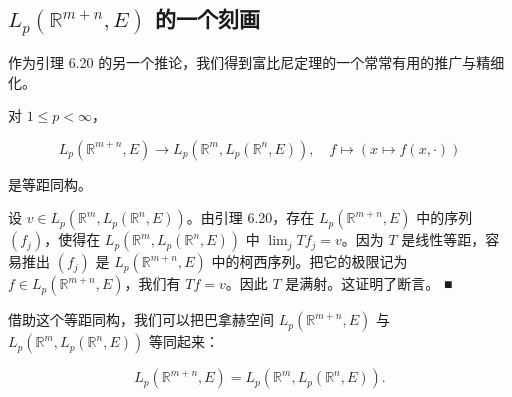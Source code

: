 \subsection*{$ L_p(\mathbb{R}^{m+n},E) $ 的一个刻画}

作为引理 6.20 的另一个推论，我们得到富比尼定理的一个常常有用的推广与精细化。

\begin{theorem}

对 $ 1 \le p < \infty $，

\[
L_{p}(\mathbb{R}^{m+n},E) \to L_{p}\left(\mathbb{R}^{m},L_{p}(\mathbb{R}^{n},E)\right) ,\quad f \mapsto (x \mapsto f(x,\cdot))
\]

是等距同构。

\proofhead
设 $ v \in L_{p}\left(\mathbb{R}^{m},L_{p}(\mathbb{R}^{n},E)\right) $。由引理 6.20，存在 $ L_{p}(\mathbb{R}^{m+n},E) $ 中的序列 $ (f_{j}) $，使得在 $ L_{p}\left(\mathbb{R}^{m},L_{p}(\mathbb{R}^{n},E)\right) $ 中 $ \lim_{j}Tf_{j} = v $。因为 $ T $ 是线性等距，容易推出 $ (f_{j}) $ 是 $ L_{p}(\mathbb{R}^{m+n},E) $ 中的柯西序列。把它的极限记为 $ f \in L_{p}(\mathbb{R}^{m+n},E) $，我们有 $ Tf = v $。因此 $ T $ 是满射。这证明了断言。 \nobreak\hspace{0.35em}■
\end{theorem}

借助这个等距同构，我们可以把巴拿赫空间 $ L_{p}(\mathbb{R}^{m+n},E) $ 与 $ L_{p}\left(\mathbb{R}^{m},L_{p}(\mathbb{R}^{n},E)\right) $ 等同起来：

\[
L_{p}(\mathbb{R}^{m+n},E) = L_{p}\left(\mathbb{R}^{m},L_{p}(\mathbb{R}^{n},E)\right) .
\]

